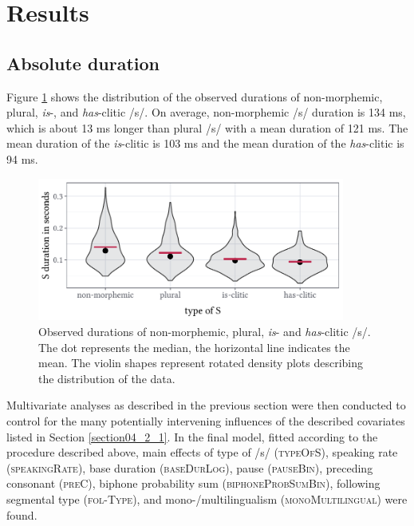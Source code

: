 \section{Results}\label{section04_3}

\subsection{Absolute duration}\label{section04_3_1}

Figure \ref{fig:4_3} shows the distribution of the observed durations of non-morphemic, plural, \textit{is}-, and \textit{has}-clitic /s/. On average, non-morphemic /s/ duration is 134 ms, which is about 13 ms longer than plural /s/ with a mean duration of 121 ms. The mean duration of the \textit{is}-clitic is 103 ms and the mean duration of the \textit{has}-clitic is 94 ms. 

\begin{figure}
    \centering
    \includegraphics[width=0.9\textwidth]{figures/fig4.3.pdf}
    \caption{Observed durations of non-morphemic, plural, \textit{is}- and \textit{has}-clitic /s/. The dot represents the median, the horizontal line indicates the mean. The violin shapes represent rotated density plots describing the distribution of the data.}
    \label{fig:4_3}
\end{figure}

Multivariate analyses as described in the previous section were then conducted to control for the many potentially intervening influences of the described covariates listed in Section \ref{section04_2_1}. In the final model, fitted according to the procedure described above, main effects of type of /s/ (\textsc{typeOfS}), speaking rate (\textsc{speakingRate}), base duration (\textsc{baseDurLog}), pause (\textsc{pauseBin}), preceding consonant (\textsc{preC}), biphone probability sum (\textsc{biphoneProbSumBin}), following segmental type (\textsc{fol-Type}), and mono-/multilingualism (\textsc{monoMultilingual}) were found.

